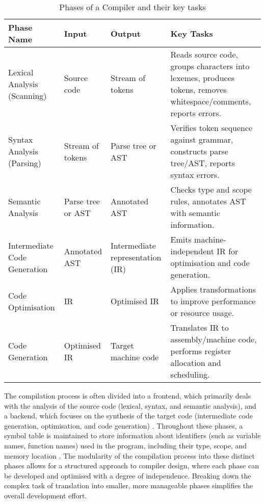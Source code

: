 \begin{table}[t]
  \centering
  \begin{tabularx}{\textwidth}{|
      >{\raggedright\arraybackslash}X|
      >{\raggedright\arraybackslash}X|
      >{\raggedright\arraybackslash}X|
      >{\raggedright\arraybackslash}X|
    }
    \hline
    \textbf{Phase Name} & \textbf{Input} & \textbf{Output} & \textbf{Key Tasks} \\
    \hline\hline
    Lexical Analysis (Scanning) &
    Source code &
    Stream of tokens &
    Reads source code, groups characters into lexemes, produces tokens, removes whitespace/comments, reports errors. \\
    \hline
    Syntax Analysis (Parsing) &
    Stream of tokens &
    Parse tree or AST &
    Verifies token sequence against grammar, constructs parse tree/AST, reports syntax errors. \\
    \hline
    Semantic Analysis &
    Parse tree or AST &
    Annotated AST &
    Checks type and scope rules, annotates AST with semantic information. \\
    \hline
    Intermediate Code Generation &
    Annotated AST &
    Intermediate representation (IR) &
    Emits machine-independent IR for optimisation and code generation. \\
    \hline
    Code Optimisation &
    IR &
    Optimised IR &
    Applies transformations to improve performance or resource usage. \\
    \hline
    Code Generation &
    Optimised IR &
    Target machine code &
    Translates IR to assembly/machine code, performs register allocation and scheduling. \\
    \hline
  \end{tabularx}
  \caption{Phases of a Compiler and their key tasks}
  \label{tab:compilation-phases}
\end{table}

The compilation process is often divided into a frontend, which primarily deals with the analysis of the source code (lexical, syntax, and semantic analysis), and a backend, which focuses on the synthesis of the target code (intermediate code generation, optimisation, and code generation) \cite{aho2007compilers}. Throughout these phases, a symbol table is maintained to store information about identifiers (such as variable names, function names) used in the program, including their type, scope, and memory location \cite{aho2007compilers}. The modularity of the compilation process into these distinct phases allows for a structured approach to compiler design, where each phase can be developed and optimised with a degree of independence. Breaking down the complex task of translation into smaller, more manageable phases simplifies the overall development effort.

